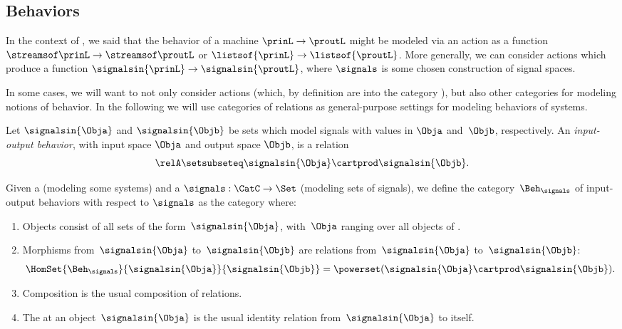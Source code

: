 \subsection{Behaviors}


In the context of , we said that the behavior of a machine $\prinL \to \proutL$ might be modeled via an action as a function $\streamsof\prinL  \to \streamsof\proutL$ or $\listsof{\prinL} \to \listsof{\proutL}$.
More generally, we can consider actions which produce a function $\signalsin{\prinL} \to \signalsin{\proutL}$, where $\signals$ is some chosen construction of signal spaces.

In some cases, we will want to not only consider actions (which, by definition are  into the category \Set), but also other categories for modeling notions of behavior.
In the following we will use categories of relations as general-purpose settings for modeling behaviors of systems.

\begin{definition}\label{def:input-output-beh}
    Let $\signalsin{\Obja}$ and $\signalsin{\Objb}$ be sets which model signals with values in $\Obja$ and~$\Objb$, respectively.
    An \emph{input-output behavior}, with input space $\Obja$ and output space $\Objb$, is a relation
    \begin{equation}
        \relA \setsubseteq \signalsin{\Obja} \cartprod \signalsin{\Objb}.
    \end{equation}
\end{definition}

\begin{definition}
    \label{def:Beh}
    Given a  \CatC (modeling some systems) and a  $\signals: \CatC \to \Set$ (modeling sets of signals), we define the category~$\Beh_\signals$ of input-output behaviors with respect to $\signals$ as the category where:
    \begin{enumerate}
        \item Objects consist of all sets of the form~$\signalsin{\Obja}$, with~$\Obja$ ranging over all objects of \CatC.
        \item Morphisms from~$\signalsin{\Obja}$ to~$\signalsin{\Objb}$ are relations from~$\signalsin{\Obja}$ to~$\signalsin{\Objb}$:
              \begin{equation}
                  \HomSet{\Beh_\signals}{\signalsin{\Obja}}{\signalsin{\Objb}} = \powerset (\signalsin{\Obja} \cartprod \signalsin{\Objb}).
              \end{equation}
        \item Composition is the usual composition of relations.
        \item The  at an object~$\signalsin{\Obja}$ is the usual identity relation from~$\signalsin{\Obja}$ to itself.
    \end{enumerate}
\end{definition}

